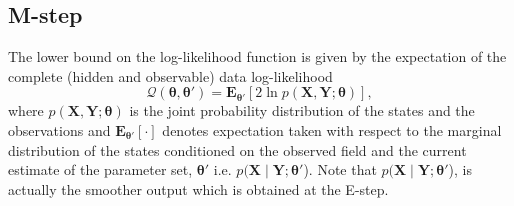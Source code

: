 \documentclass[review,authoryear,3p]{elsarticle}
\begin{document}
 \subsection{M-step}
The lower bound on the log-likelihood function is given by the expectation of the complete (hidden and observable) data  log-likelihood \citep{Bishop2006} 
\begin{equation}\label{eq:Bishopbound}
	\mathcal Q(\boldsymbol \theta,\boldsymbol\theta')= \mathbf E_{\boldsymbol \theta'}\left[2\ln p(\mathbf X,\mathbf Y;\boldsymbol \theta)\right], 
\end{equation}
where $p(\mathbf X,\mathbf Y;\boldsymbol \theta)$ is the joint probability distribution of the states and the observations and $ \mathbf E_{\boldsymbol \theta'}\left[\cdot\right] $ denotes expectation taken with respect to the marginal distribution of the states conditioned on the observed field and the current estimate of the parameter set, $\boldsymbol\theta'$ i.e.  $p(\mathbf X\mid\mathbf Y;\boldsymbol \theta'$). Note that $p(\mathbf X\mid\mathbf Y;\boldsymbol \theta'$), is actually the smoother output which is obtained at the E-step.
\end{document}
